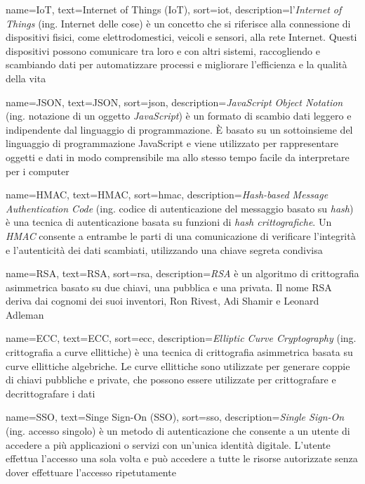  {
    name=IoT,
    text=Internet of Things (IoT),
    sort=iot,
    description={l'\emph{Internet of Things} (ing. Internet delle cose) è un concetto che si riferisce alla connessione di dispositivi fisici, come elettrodomestici, veicoli e sensori, alla rete Internet. Questi dispositivi possono comunicare tra loro e con altri sistemi, raccogliendo e scambiando dati per automatizzare processi e migliorare l'efficienza e la qualità della vita}
}

 {
    name=JSON,
    text=JSON,
    sort=json,
    description={\emph{JavaScript Object Notation} (ing. notazione di un oggetto \emph{JavaScript}) è un formato di scambio dati leggero e indipendente dal linguaggio di programmazione. È basato su un sottoinsieme del linguaggio di programmazione JavaScript e viene utilizzato per rappresentare oggetti e dati in modo comprensibile ma allo stesso tempo facile da interpretare per i computer}
}

 {
    name=HMAC,
    text=HMAC,
    sort=hmac,
    description={\emph{Hash-based Message Authentication Code} (ing. codice di autenticazione del messaggio basato su \emph{hash}) è una tecnica di autenticazione basata su funzioni di \emph{hash crittografiche}. Un \emph{HMAC} consente a entrambe le parti di una comunicazione di verificare l'integrità e l'autenticità dei dati scambiati, utilizzando una chiave segreta condivisa}
}

 {
    name=RSA,
    text=RSA,
    sort=rsa,
    description={\emph{RSA} è un algoritmo di crittografia asimmetrica basato su due chiavi, una pubblica e una privata. Il nome RSA deriva dai cognomi dei suoi inventori, Ron Rivest, Adi Shamir e Leonard Adleman}
}

 {
    name=ECC,
    text=ECC,
    sort=ecc,
    description={\emph{Elliptic Curve Cryptography} (ing. crittografia a curve ellittiche) è una tecnica di crittografia asimmetrica basata su curve ellittiche algebriche. Le curve ellittiche sono utilizzate per generare coppie di chiavi pubbliche e private, che possono essere utilizzate per crittografare e decrittografare i dati}
}

 {
    name=SSO,
    text=Singe Sign-On (SSO),
    sort=sso,
    description={\emph{Single Sign-On} (ing. accesso singolo) è un metodo di autenticazione che consente a un utente di accedere a più applicazioni o servizi con un'unica identità digitale. L'utente effettua l'accesso una sola volta e può accedere a tutte le risorse autorizzate senza dover effettuare l'accesso ripetutamente}
}

